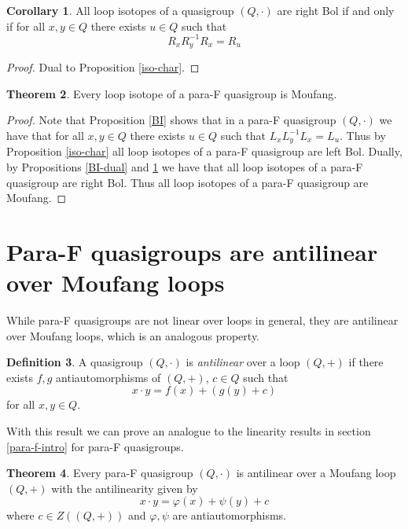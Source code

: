 \documentclass[12pt]{report}
\theoremstyle{definition}
\newtheorem{thm}{Theorem}[chapter]
\newtheorem{cor}[thm]{Corollary}
\newtheorem{dfn}[thm]{Definition}
\begin{document}
\begin{cor}\label{iso-char-dual}
  All loop isotopes of a quasigroup $(Q, \cdot)$ are right Bol if and only if for all $x, y\in Q$ there exists $u\in Q$ such that
  \[R_x R_y^{-1} R_x = R_u\]
\end{cor}

\begin{proof}
  Dual to Proposition \ref{iso-char}.
\end{proof}

\begin{thm}\label{thm-iso-moufang}
  Every loop isotope of a para-F quasigroup is Moufang.
\end{thm}

\begin{proof}
  Note that Proposition \ref{BI} shows that in a para-F quasigroup $(Q, \cdot)$ we have that for all
    $x, y\in Q$ there exists $u\in Q$ such that $L_x L_y^{-1} L_x = L_u$. Thus by Proposition
    \ref{iso-char} all loop isotopes of a para-F quasigroup are left Bol. Dually, by Propositions
    \ref{BI-dual} and \ref{iso-char-dual} we have that all loop isotopes of a para-F quasigroup are
    right Bol. Thus all loop isotopes of a para-F quasigroup are Moufang. 
\end{proof}

\section{Para-F quasigroups are antilinear over Moufang loops}

While para-F quasigroups are not linear over loops in general, they are antilinear over Moufang loops,
  which is an analogous property.

\begin{dfn}
  A quasigroup $(Q, \cdot)$ is \emph{antilinear} over a loop $(Q, +)$ if there exists $f, g$
    antiautomorphisms of $(Q, +)$, $c\in Q$ such that
  \[x\cdot y = f(x) + (g(y) + c)\]
  for all $x, y\in Q$.
\end{dfn}

With this result we can prove an analogue to the linearity results in section \ref{para-f-intro}
  for para-F quasigroups.

\begin{thm}\label{thm-para-f}
  Every para-F quasigroup $(Q, \cdot)$ is antilinear over a Moufang loop $(Q, +)$ with the antilinearity
    given by
  \[x\cdot y = \varphi(x) + \psi(y) + c\] 
  where $c\in Z((Q, +))$ and $\varphi, \psi$ are antiautomorphisms.
\end{thm}
\end{document}
